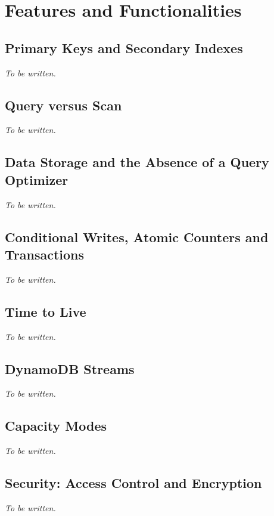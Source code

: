 
\section{Features and Functionalities}\label{sec:features}

\subsection{Primary Keys and Secondary Indexes}

\textit{To be written.}

\subsection{Query versus Scan}

\textit{To be written.}

\subsection{Data Storage and the Absence of a Query Optimizer}

\textit{To be written.}

\subsection{Conditional Writes, Atomic Counters and Transactions}

\textit{To be written.}

\subsection{Time to Live}

\textit{To be written.}

\subsection{DynamoDB Streams}

\textit{To be written.}

\subsection{Capacity Modes}

\textit{To be written.}

\subsection{Security: Access Control and Encryption}

\textit{To be written.}

